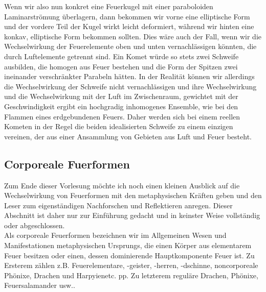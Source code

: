 \documentclass[a5paper,8pt]{book}
\begin{document}
Wenn wir also nun konkret eine Feuerkugel mit einer paraboloiden Laminarströmung überlagern, dann bekommen wir vorne eine 
elliptische Form und der vordere Teil der Kugel wirkt leicht deformiert, während wir hinten eine konkav, elliptische Form 
bekommen sollten. Dies wäre auch der Fall, wenn wir die Wechselwirkung der Feuerelemente oben und unten vernachlässigen 
könnten, die durch Luftelemente getrennt sind. Ein Komet würde so stets zwei Schweife ausbilden, die homogen aus Feuer 
bestehen und die Form der Spitzen zwei ineinander verschränkter Parabeln hätten.
In der Realität können wir allerdings die Wechselwirkung der Schweife nicht vernachlässigen und ihre Wechselwirkung und die 
Wechselwirkung mit der Luft im Zwischenraum, gewichtet mit der Geschwindigkeit ergibt ein hochgradig inhomogenes Ensemble,
wie bei den Flammen eines erdgebundenen Feuers. Daher werden sich bei einem reellen Kometen in der Regel die beiden 
idealisierten Schweife zu einem einzigen vereinen, der aus einer Ansammlung von Gebieten aus Luft und Feuer besteht.

\subsection{Corporeale Fuerformen}

Zum Ende dieser Vorlesung möchte ich noch einen kleinen Ausblick auf die Wechselwirkung von Feuerformen mit den 
metaphysischen Kräften geben und den Leser zum eigenständigen Nachforschen und Reflektieren anregen. Dieser Abschnitt 
ist daher nur zur Einführung gedacht und in keinster Weise vollständig oder abgeschlossen.\\

Als corporeale Feuerformen bezeichnen wir im Allgemeinen Wesen und Manifestationen metaphysischen Ursprungs, die einen 
Körper aus elementarem Feuer besitzen oder einen, dessen dominierende Hauptkomponente Feuer ist. Zu Ersterem zählen z.B. 
Feuerelementare, -geister, -herren, -dschinne, noncorporeale Phönixe, Drachen und Harpyien\footnotemark[5] etc. pp. Zu letzterem reguläre 
Drachen, Phönixe, Feuersalamander usw..\\

\end{document}
